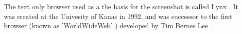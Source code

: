 The text only browser used as a the basis for the screenshot is called Lynx \cite{lynx}.
It was created at the Univesity of Kanas in 1992, and was successor to the first browser (known as 'WorldWideWeb' \cite{browser-history}) developed by Tim Bernes Lee \cite{tim-berners-lee}.
